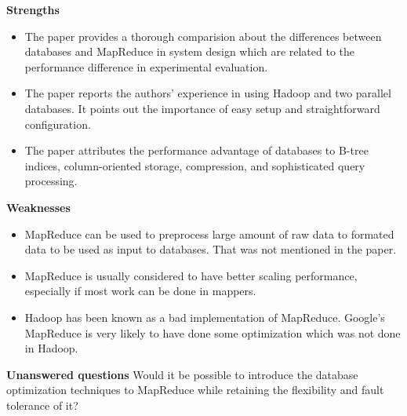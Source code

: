 \documentclass[12pt, a4paper]{llncs}
\begin{document}
\noindent
\textbf{Strengths}
\begin{itemize}
\item The paper provides a thorough comparision about the differences between 
databases and MapReduce in system design which are related to the performance 
difference in experimental evaluation.

\item The paper reports the authors' experience in using Hadoop and two parallel
databases. It points out the importance of easy setup and straightforward 
configuration.

\item The paper attributes the performance advantage of databases to B-tree 
indices, column-oriented storage, compression, and sophisticated query 
processing.
  
\end{itemize}

\vspace{10pt}

\noindent
\textbf{Weaknesses}

\begin{itemize}

\item MapReduce can be used to preprocess large amount of raw data to formated 
  data to be used as input to databases. That was not mentioned in the paper.

\item MapReduce is usually considered to have better scaling performance, 
especially if most work can be done in mappers.

\item Hadoop has been known as a bad implementation of MapReduce. Google's
MapReduce is very likely to have done some optimization which was not done in 
Hadoop.

\end{itemize}

\vspace{10pt}

\noindent
\textbf{Unanswered questions}
Would it be possible to introduce the database optimization techniques to 
MapReduce while retaining the flexibility and fault tolerance of it?
\end{document}
